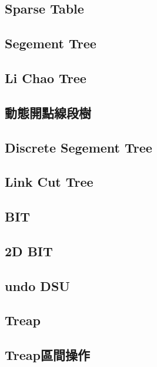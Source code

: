 \subsection{Sparse Table}

\subsection{Segement Tree}

\subsection{Li Chao Tree}

\subsection{動態開點線段樹}

\subsection{Discrete Segement Tree}

\subsection{Link Cut Tree}

\subsection{BIT}

\subsection{2D BIT}

\subsection{undo DSU}

\subsection{Treap}

\subsection{Treap區間操作}


